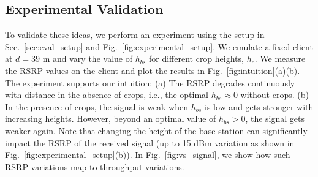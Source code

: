 \begin{figure*}[!t] %
  \centering
  \hfill
  \hfill
  \vspace{-0.1in}
  \caption{\textbf{Intuition for the optimal height.} We place a client at a horizontal distance $d$ from the base station and vary the height of the base station $h_{\text{bs}}$ by flying the drone vertically up and down (see Fig.~\ref{fig:experimental_setup}). We scatter plot the observed RSRP at the client vs the base station height. The best-fit line is shown in grey. The optimal heights are marked as dotted red lines.}
  \label{fig:intuition}
\vspace{-0.2in}
\end{figure*}

\subsection{Experimental Validation}


To validate these ideas, we perform an experiment using the setup in Sec.~\ref{sec:eval_setup} and  Fig.~\ref{fig:experimental_setup}. We emulate a fixed client at $d=39$ m and vary the value of $h_{bs}$ for different crop heights, $h_c$. We measure the RSRP values on the client and plot the results in Fig.~\ref{fig:intuition}(a)(b). The experiment supports our intuition: (a) The RSRP degrades continuously with distance in the absence of crops, i.e., the optimal $h_{bs} \approx 0$ without crops. (b) In the presence of crops, the signal is weak when $h_{bs}$ is low and gets stronger with increasing heights. However, beyond an optimal value of $h_{bs} > 0$, the signal gets weaker again. Note that changing the height of the base station can significantly impact the RSRP of the received signal (up to 15 dBm variation as shown in Fig.~\ref{fig:experimental_setup}(b)). In Fig.~\ref{fig:vs_signal}, we show how such RSRP variations map to throughput variations. %

